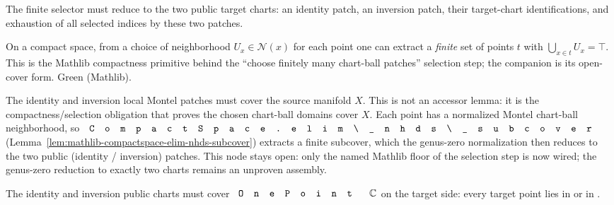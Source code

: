 \begin{lemma}
\label{lem:montel-two-chart-target-assignment}
The finite selector must reduce to the two public target charts: an identity
patch, an inversion patch, their target-chart identifications, and exhaustion
of all selected indices by these two patches.
\end{lemma}

\begin{lemma}
\label{lem:mathlib-compactspace-elim-nhds-subcover}
On a compact space, from a choice of neighborhood \(U_x\in\mathcal N(x)\) for each
point one can extract a \emph{finite} set of points \(t\) with
\(\bigcup_{x\in t}U_x=\top\). This is the Mathlib compactness primitive behind the
``choose finitely many chart-ball patches'' selection step; the companion
 is its open-cover form. Green (Mathlib).
\leanok
\end{lemma}

\begin{lemma}
\label{lem:montel-two-chart-source-cover}
The identity and inversion local Montel patches must cover the source
manifold \(X\). This is not an accessor lemma: it is the compactness/selection
obligation that proves the chosen chart-ball domains cover \(X\). Each point
has a normalized Montel chart-ball neighborhood, so
\(\code{CompactSpace.elim\_nhds\_subcover}\)
(Lemma~\ref{lem:mathlib-compactspace-elim-nhds-subcover}) extracts a finite
subcover, which the genus-zero normalization then reduces to the two public
(identity / inversion) patches. This node stays open: only the named Mathlib
floor of the selection step is now wired; the genus-zero reduction to exactly two
charts remains an unproven assembly.
\end{lemma}

\begin{lemma}
\label{lem:montel-two-chart-target-cover}
The identity and inversion public charts must cover
\(\code{OnePoint}\,\C\) on the target side: every target point lies in
 or in .
\leanok
\end{lemma}

